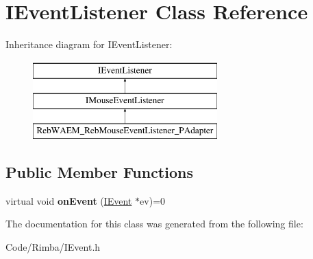 \hypertarget{class_i_event_listener}{}\section{I\+Event\+Listener Class Reference}
\label{class_i_event_listener}
Inheritance diagram for I\+Event\+Listener\+:\begin{figure}[H]
\begin{center}
\leavevmode
\includegraphics[height=3.000000cm]{class_i_event_listener}
\end{center}
\end{figure}
\subsection*{Public Member Functions}
\begin{DoxyCompactItemize}
\item 
virtual void {\bfseries on\+Event} (\hyperlink{class_i_event}{I\+Event} $\ast$ev)=0\hypertarget{class_i_event_listener_a967fcdde8dbc56c39c51b5280f1e4d3b}{}\label{class_i_event_listener_a967fcdde8dbc56c39c51b5280f1e4d3b}

\end{DoxyCompactItemize}


The documentation for this class was generated from the following file\+:\begin{DoxyCompactItemize}
\item 
Code/\+Rimba/I\+Event.\+h\end{DoxyCompactItemize}
